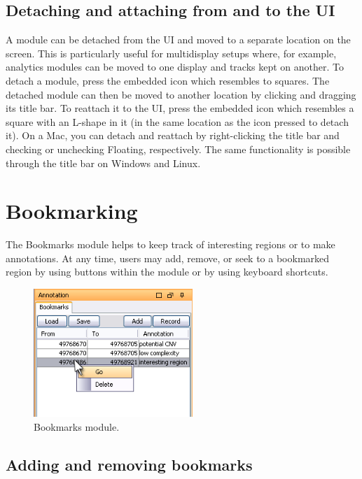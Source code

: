 \documentclass{report}
\begin{document}
\section{Detaching and attaching from and to the UI}

A module can be detached from the UI and moved to a separate location on the screen. This is particularly useful for multidisplay setups where, for example, analytics modules can be moved to one display and tracks kept on another. To detach a module, press the embedded icon which resembles to squares. The detached module can then be moved to another location by clicking and dragging its title bar. To reattach it to the UI, press the embedded icon which resembles a square with an L-shape in it (in the same location as the icon pressed to detach it). On a Mac, you can detach and reattach by right-clicking the title bar and checking or unchecking Floating, respectively. The same functionality is possible through the title bar on Windows and Linux.


\chapter{Bookmarking}

The Bookmarks module helps to keep track of interesting regions or to make annotations. At any time, users may add, remove, or seek to a bookmarked region by using buttons within the module or by using keyboard shortcuts. 

\begin{figure}[!h]
\begin{center}
\includegraphics[type=png,ext=.png,read=.png,width=6cm]{images/bookmarks}
\caption{Bookmarks module.  }
\label{rangecontrolpanel}
\end{center}
\end{figure}

\section{Adding and removing bookmarks}
\end{document}
